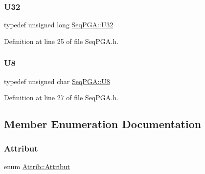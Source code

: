 \mbox{\label{classSeqPGA_a9e9a99e1d7586223a7c118a19deef42c}} 
\subsubsection{\texorpdfstring{U32}{U32}}
{\footnotesize\ttfamily typedef unsigned long \hyperlink{classSeqPGA_a9e9a99e1d7586223a7c118a19deef42c}{Seq\+P\+G\+A\+::\+U32}}



Definition at line 25 of file Seq\+P\+G\+A.\+h.

\mbox{\label{classSeqPGA_ace27b11f060e537a6fd756cc3eca5347}} 
\subsubsection{\texorpdfstring{U8}{U8}}
{\footnotesize\ttfamily typedef unsigned char \hyperlink{classSeqPGA_ace27b11f060e537a6fd756cc3eca5347}{Seq\+P\+G\+A\+::\+U8}}



Definition at line 27 of file Seq\+P\+G\+A.\+h.



\subsection{Member Enumeration Documentation}
\mbox{\label{classAttrib_a69e171d7cc6417835a5a306d3c764235}} 
\subsubsection{\texorpdfstring{Attribut}{Attribut}}
{\footnotesize\ttfamily enum \hyperlink{classAttrib_a69e171d7cc6417835a5a306d3c764235}{Attrib\+::\+Attribut}\hspace{0.3cm}{\ttfamily [inherited]}}

